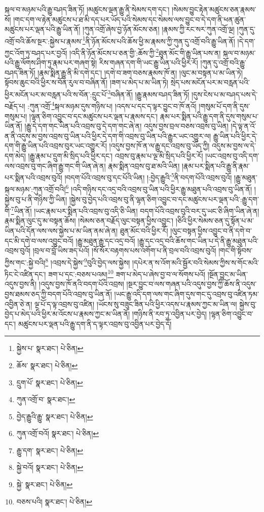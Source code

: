 སྐལ་བ་མཉམ་པའི་རྒྱུ་བཤད་ཟིན་ཏོ། །མཚུངས་ལྡན་རྒྱུ་ནི་སེམས་དག་དང་། །སེམས་བྱུང་རྟེན་མཚུངས་ཅན་རྣམས་སོ། །གང་དག་ལ་རྟེན་མཚུངས་པ་ཐ་མི་དད་པར་ཡོད་པའི་སེམས་དང་སེམས་ལས་བྱུང་བ་དེ་དག་ནི་ཕན་ཚུན་མཚུངས་པར་ལྡན་པའི་རྒྱུ་ཡིན་ནོ། །ཀུན་འགྲོ་ཞེས་བྱ་ཉོན་མོངས་ཅན། །རྣམས་ཀྱི་རང་སར་ཀུན་འགྲོ་ལྔ། །ཀུན་དུ་འགྲོ་བའི་ཆོས་སྔར་:སྐྱེས་པ་རྣམས་\footnote{སྐྱེས་པ་  སྣར་ཐང་།  པེ་ཅིན། }ནི་ཉོན་མོངས་པའི་ཆོས་ཕྱི་མ་རྣམས་ཀྱི་ཀུན་དུ་འགྲོ་བའི་རྒྱུ་ཡིན་ནོ། །དེ་དག་ཀྱང་འོག་ཏུ་བཤད་པར་བྱའོ། །འདི་ནི་ཉོན་མོངས་པ་ཅན་གྱི་:ཆོས་ཀྱི་\footnote{ཆོས་  སྣར་ཐང་།  པེ་ཅིན། }ཐུན་མོང་གི་རྒྱུ་ཡིན་པས་ན། སྐལ་བ་མཉམ་པའི་རྒྱུ་ལོགས་ཤིག་ཏུ་རྣམ་པར་གཞག་སྟེ། རིས་གཞན་དག་གི་ཡང་རྒྱུ་ཡིན་པའི་ཕྱིར་རོ། །ཀུན་དུ་འགྲོ་བའི་རྒྱུ་བཤད་ཟིན་ཏོ། །རྣམ་སྨིན་རྒྱུ་ནི་མི་དགེ་དང་། །དགེ་བ་ཟག་བཅས་རྣམས་ཁོ་ན། །ལུང་མ་བསྟན་པ་མ་ཡིན་ཏེ། སྟོབས་ཆུང་བའི་ཕྱིར་ས་བོན་རུལ་བ་བཞིན་ནོ། །ཟག་པ་མེད་པ་མ་ཡིན་ཏེ། སྲེད་པས་མངོན་པར་མ་བརླན་པའི་ཕྱིར་མངོན་པར་མ་བརླན་པའི་ས་བོན་:དྲུང་པོ་\footnote{དྲུག་པོ་  སྣར་ཐང་།  པེ་ཅིན། }བཞིན་ནོ། །རྒྱུ་རྣམས་བཤད་ཟིན་ཏོ། །དུས་ངེས་པ་མ་བཤད་པས་དེ་བརྗོད་པ། :ཀུན་འགྲོ་\footnote{ཀུན་འགྲོ་བ་  སྣར་ཐང་། }སྐལ་མཉམ་དུས་གཉིས་པ། །འདས་པ་དང་ད་ལྟར་བྱུང་བ་ཁོ་ནའོ། །གསུམ་པོ་དག་ནི་དུས་གསུམ་པ། །ལྷན་ཅིག་འབྱུང་བ་དང་མཚུངས་པར་ལྡན་པ་རྣམས་དང་། རྣམ་པར་སྨིན་པའི་རྒྱུ་དག་ནི་དུས་གསུམ་པ་ཡིན་ནོ། །རྒྱུ་དེ་དག་གང་ཡིན་པའི་འབྲས་བུ་དེ་དག་གང་ཞེ་ན། འདུས་བྱས་བྲལ་བཅས་འབྲས་བུ་ཡིན། །དེ་ལྟ་ན་འོ་ན་ནི་འདུས་མ་བྱས་འབྲས་བུ་ཡིན་པའི་ཕྱིར་དེ་དག་གི་འབྲས་བུ་ཡིན་པའི་རྒྱུར་ཡང་འགྱུར་ལ། རྒྱུ་ཡིན་པའི་ཕྱིར་དེ་དག་གི་རྒྱུ་ཡིན་པའི་འབྲས་བུར་ཡང་འགྱུར་རོ། །འདུས་བྱས་ཁོ་ན་ལ་རྒྱུ་དང་འབྲས་བུ་ཡོད་ཀྱི། འདུས་མ་བྱས་ལ་དེ་དག་མེད། །རྒྱུ་རྣམ་པ་དྲུག་མི་སྲིད་པའི་ཕྱིར་དང་། འབྲས་བུ་རྣམ་པ་ལྔ་མི་སྲིད་པའི་ཕྱིར་རོ། །ཡང་འབྲས་བུ་འདི་དག་ལས་འབྲས་བུ་གང་ཞིག་རྒྱུ་གང་གི་ཡིན་ཞེ་ན། རྣམ་སྨིན་འབྲས་བུ་ཐ་མའི་ཡིན། །རྣམ་པར་སྨིན་པའི་རྒྱུ་ནི་རྣམ་པར་སྨིན་པའི་འབྲས་བུའོ། །བདག་པོའི་འབྲས་བུ་དང་པོའི་ཡིན། །:བྱེད་རྒྱུའི་\footnote{བྱེད་རྒྱུའི་རྒྱུ་  སྣར་ཐང་།  པེ་ཅིན། }ནི་བདག་པོའི་འབྲས་བུའོ། །རྒྱུ་མཐུན་སྐལ་མཉམ་:ཀུན་འགྲོ་བའི།\footnote{ཀུན་འགྲོ་བའོ།  སྣར་ཐང་།  པེ་ཅིན། } །འདི་གཉིས་དང་འདྲ་བའི་འབྲས་བུ་ཡིན་པའི་ཕྱིར་རྒྱུ་མཐུན་པའི་འབྲས་བུ་ཡིན་ནོ། །སྐྱེས་བུ་པ་ནི་གཉིས་ཀྱི་ཡིན། །སྐྱེས་བུ་བྱེད་པའི་འབྲས་བུ་ནི་ལྷན་ཅིག་འབྱུང་བ་དང་མཚུངས་པར་ལྡན་པའི་:རྒྱུ་དག་གི་\footnote{རྒྱུ་དག་  སྣར་ཐང་།  པེ་ཅིན། }ཡིན་ནོ། །ཡང་རྣམ་པར་སྨིན་པའི་འབྲས་བུ་འདི་ཅི་ཡིན། བདག་པོའི་འབྲས་བུའི་བར་དུ་ཡང་ཅི་ཞིག་ཡིན་ཞེ་ན། རྣམ་སྨིན་ལུང་དུ་མ་བསྟན་ཆོས། །སེམས་ཅན་བརྗོད་ལུང་བསྟན་ཕྱིས་འབྱུང་། །ཅིའི་ཕྱིར་སེམས་ཅན་དུ་སྟོན་པ་མ་ཡིན་པའི་དོན་ལས་ལས་སྐྱེས་པ་མ་ཡིན་ནམ་ཞེ་ན། ཐུན་མོང་བའི་ཕྱིར་རོ། །ལུང་བསྟན་ཕྱིས་འབྱུང་བ་ནི་དགེ་བ་དང་མི་དགེ་བ་ལས་འབྱུང་བའོ། །རྒྱུ་མཐུན་རྒྱུ་དང་འདྲ་བའོ། །རྒྱུ་དང་འདྲ་བའི་ཆོས་གང་ཡིན་པ་དེ་ནི་རྒྱུ་མཐུན་པའི་འབྲས་བུའོ། །བྲལ་བ་བློ་ཡིས་ཟད་པའོ། །སོ་སོར་བརྟགས་པས་འགོག་པ་ནི་བྲལ་བའི་འབྲས་བུའོ། །གང་གི་སྟོབས་ཀྱིས་གང་:སྐྱེ་བའི།\footnote{སྐྱེ་བའོ།  སྣར་ཐང་།  པེ་ཅིན། } །འབྲས་དེ་སྐྱེས་\footnote{སྐྱེ་  སྣར་ཐང་།  པེ་ཅིན། }བུའི་བྱེད་ལས་སྐྱེས། །དཔེར་ན་ས་འོག་མའི་སྦྱོར་བའི་སེམས་ཀྱིས་ས་གོང་མའི་ཏིང་ངེ་འཛིན་དང་། ཟག་པ་དང་:བཅས་པའམ།\footnote{བཅས་པའི།  སྣར་ཐང་།  པེ་ཅིན། } ཟག་པ་མེད་པ་ཞེས་བྱ་བ་ལ་སོགས་པའོ། །སྔོན་བྱུང་མ་ཡིན་འདུས་བྱས་ནི། །འདུས་བྱས་ཁོ་ནའི་བདག་པོའི་འབྲས། །སྔར་བྱུང་བ་ལས་གཞན་པའི་འདུས་བྱས་ཀྱི་ཆོས་ནི་འདུས་བྱས་ཐམས་ཅད་ཀྱི་བདག་པོའི་འབྲས་བུ་ཡིན་ནོ། །ཡང་རྒྱུ་འདི་དག་ལས་གང་ཞིག་དུས་གང་དུ་འབྲས་བུ་འཛིན་ཏམ་འབྱིན་ཅེ་ན། ལྔ་པོ་ད་ལྟ་འབྲས་བུ་འཛིན། །ཡོངས་སུ་བཟུང་ཟིན་པའི་ཕྱིར་འདས་པ་རྣམས་ཀྱང་མ་ཡིན་ལ། སྐྱེས་བུ་བྱེད་པ་མེད་པའི་ཕྱིར་མ་འོངས་པ་རྣམས་ཀྱང་མ་ཡིན་ནོ། །གཉིས་ནི་རབ་ཏུ་འབྱིན་པར་བྱེད། །ལྷན་ཅིག་འབྱུང་བ་དང་། མཚུངས་པར་ལྡན་པའི་རྒྱུ་དག་ནི་ད་ལྟར་འབྲས་བུ་འབྱིན་པར་བྱེད་དོ། 